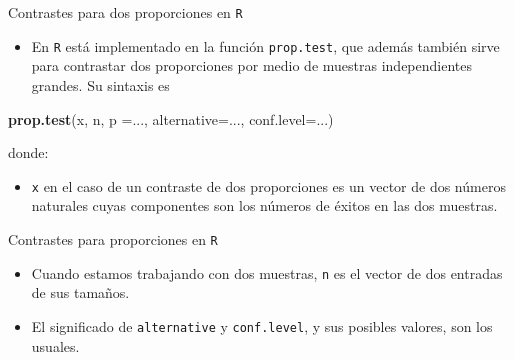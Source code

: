 \documentclass[
  ignorenonframetext,
]{beamer}
\newenvironment{Shaded}{\begin{snugshade}}{\end{snugshade}}
\newcommand{\DataTypeTok}[1]{\textcolor[rgb]{0.13,0.29,0.53}{#1}}
\newcommand{\KeywordTok}[1]{\textcolor[rgb]{0.13,0.29,0.53}{\textbf{#1}}}
\newcommand{\NormalTok}[1]{#1}
\providecommand{\tightlist}{%
  \setlength{\itemsep}{0pt}\setlength{\parskip}{0pt}}
\begin{document}
\begin{frame}[fragile]{Contrastes para dos proporciones en \texttt{R}}
\protect\hypertarget{contrastes-para-dos-proporciones-en-r}{}
\begin{itemize}
\tightlist
\item
  En \texttt{R} está implementado en la función \texttt{prop.test}, que
  además también sirve para contrastar dos proporciones por medio de
  muestras independientes grandes. Su sintaxis es
\end{itemize}

\begin{Shaded}
\begin{Highlighting}[]
\KeywordTok{prop.test}\NormalTok{(x, n, }\DataTypeTok{p =}\NormalTok{..., }\DataTypeTok{alternative=}\NormalTok{..., }\DataTypeTok{conf.level=}\NormalTok{...)}
\end{Highlighting}
\end{Shaded}

donde:

\begin{itemize}
\tightlist
\item
  \texttt{x} en el caso de un contraste de dos proporciones es un vector
  de dos números naturales cuyas componentes son los números de éxitos
  en las dos muestras.
\end{itemize}
\end{frame}

\begin{frame}[fragile]{Contrastes para proporciones en \texttt{R}}
\protect\hypertarget{contrastes-para-proporciones-en-r}{}
\begin{itemize}
\item
  Cuando estamos trabajando con dos muestras, \texttt{n} es el vector de
  dos entradas de sus tamaños.
\item
  El significado de \texttt{alternative} y \texttt{conf.level}, y sus
  posibles valores, son los usuales.
\end{itemize}
\end{frame}
\end{document}
